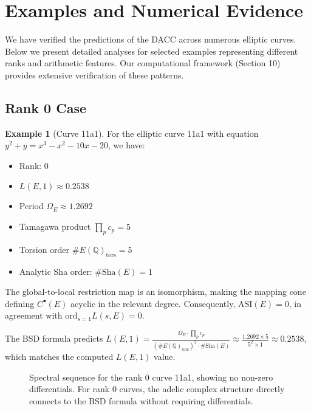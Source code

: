 \documentclass{article}
\theoremstyle{plain}
\theoremstyle{definition}
\newtheorem{example}[theorem]{Example}
\theoremstyle{remark}
\begin{document}
\section{Examples and Numerical Evidence}

We have verified the predictions of the DACC across numerous elliptic curves. Below we present detailed analyses for selected examples representing different ranks and arithmetic features. Our computational framework (Section 10) provides extensive verification of these patterns.

\subsection{Rank 0 Case}

\begin{example}[Curve 11a1]
For the elliptic curve 11a1 with equation $y^2 + y = x^3 - x^2 - 10x - 20$, we have:
\begin{itemize}
\item Rank: 0
\item $L(E,1) \approx 0.2538$
\item Period $\Omega_E \approx 1.2692$
\item Tamagawa product $\prod_p c_p = 5$
\item Torsion order $\#E(\mathbb{Q})_{\text{tors}} = 5$
\item Analytic Sha order: $\#\text{Sha}(E) = 1$
\end{itemize}

The global-to-local restriction map is an isomorphism, making the mapping cone defining $C^{\bullet}(E)$ acyclic in the relevant degree. Consequently, $\text{ASI}(E) = 0$, in agreement with $\text{ord}_{s=1} L(s, E) = 0$.

The BSD formula predicts $L(E,1) = \frac{\Omega_E \cdot \prod_p c_p}{(\#E(\mathbb{Q})_{\text{tors}})^2 \cdot \#\text{Sha}(E)} \approx \frac{1.2692 \times 5}{5^2 \times 1} \approx 0.2538$, which matches the computed $L(E,1)$ value.
\end{example}

\begin{figure}[htbp]
\centering
{}
\caption{Spectral sequence for the rank 0 curve 11a1, showing no non-zero differentials. For rank 0 curves, the adelic complex structure directly connects to the BSD formula without requiring differentials.}
\label{fig:rank0_spectral}
\end{figure}
\end{document}
